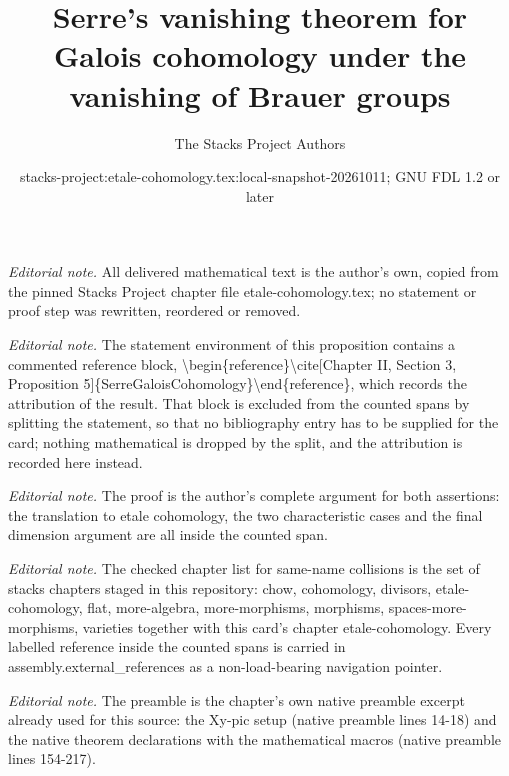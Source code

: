 \documentclass[10pt,a4paper]{amsart}
\title{Serre's vanishing theorem for Galois cohomology under the vanishing of Brauer groups}
\author{The Stacks Project Authors}
\date{stacks-project:etale-cohomology.tex:local-snapshot-20261011; GNU FDL 1.2 or later}
\theoremstyle{plain}
\theoremstyle{definition}
\theoremstyle{remark}
\numberwithin{equation}{subsection}
\begin{document}
\maketitle
\noindent\textit{Editorial note.} All delivered mathematical text is the author's own, copied from the pinned Stacks Project chapter file etale-cohomology.tex; no statement or proof step was rewritten, reordered or removed.\par\medskip
\noindent\textit{Editorial note.} The statement environment of this proposition contains a commented reference block, \textbackslash{}begin\{reference\}\textbackslash{}cite[Chapter II, Section 3, Proposition 5]\{SerreGaloisCohomology\}\textbackslash{}end\{reference\}, which records the attribution of the result. That block is excluded from the counted spans by splitting the statement, so that no bibliography entry has to be supplied for the card; nothing mathematical is dropped by the split, and the attribution is recorded here instead.\par\medskip
\noindent\textit{Editorial note.} The proof is the author's complete argument for both assertions: the translation to etale cohomology, the two characteristic cases and the final dimension argument are all inside the counted span.\par\medskip
\noindent\textit{Editorial note.} The checked chapter list for same-name collisions is the set of stacks chapters staged in this repository: chow, cohomology, divisors, etale-cohomology, flat, more-algebra, more-morphisms, morphisms, spaces-more-morphisms, varieties together with this card's chapter etale-cohomology. Every labelled reference inside the counted spans is carried in assembly.external\_references as a non-load-bearing navigation pointer.\par\medskip
\noindent\textit{Editorial note.} The preamble is the chapter's own native preamble excerpt already used for this source: the Xy-pic setup (native preamble lines 14-18) and the native theorem declarations with the mathematical macros (native preamble lines 154-217).\par\medskip
\end{document}
